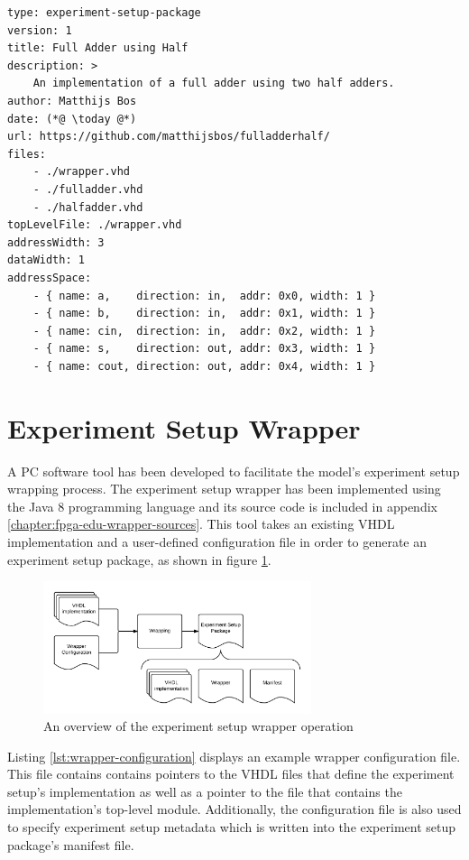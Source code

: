 \documentclass[main.tex]{subfiles}
\begin{document}
\begin{lstlisting}[caption={Example experiment setup package \texttt{manifest.yaml}}, label={lst:experiment-setup-package-manifest}]
type: experiment-setup-package
version: 1
title: Full Adder using Half
description: >
    An implementation of a full adder using two half adders.
author: Matthijs Bos
date: (*@ \today @*)
url: https://github.com/matthijsbos/fulladderhalf/
files: 
    - ./wrapper.vhd
    - ./fulladder.vhd
    - ./halfadder.vhd
topLevelFile: ./wrapper.vhd
addressWidth: 3
dataWidth: 1
addressSpace:
    - { name: a,    direction: in,  addr: 0x0, width: 1 }
    - { name: b,    direction: in,  addr: 0x1, width: 1 }
    - { name: cin,  direction: in,  addr: 0x2, width: 1 }
    - { name: s,    direction: out, addr: 0x3, width: 1 }
    - { name: cout, direction: out, addr: 0x4, width: 1 }
\end{lstlisting}






\section{Experiment Setup Wrapper}
\label{section:experiment_setup_wrapper}
A PC software tool has been developed to facilitate the model's experiment setup wrapping process. The experiment setup wrapper has been implemented using the Java 8 programming language and its source code is included in appendix \ref{chapter:fpga-edu-wrapper-sources}. This tool takes an existing VHDL implementation and a user-defined configuration file in order to generate an experiment setup package, as shown in figure \ref{fig:wrapper-overview}. 

\begin{figure}[h]
    \centering
    \includegraphics[width=0.7\textwidth]{img/wrapper}
    \caption{An overview of the experiment setup wrapper operation}
    \label{fig:wrapper-overview}
\end{figure}

Listing \ref{lst:wrapper-configuration} displays an example wrapper configuration file. This file contains contains pointers to the VHDL files that define the experiment setup's implementation as well as a pointer to the file that contains the implementation's top-level module. Additionally, the configuration file is also used to specify experiment setup metadata which is written into the experiment setup package's manifest file. 
\end{document}
